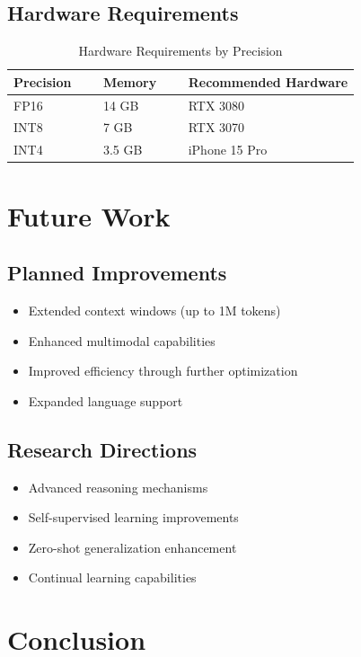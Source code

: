 \documentclass[11pt,a4paper]{article}
\begin{document}
\subsection{Hardware Requirements}
\begin{table}[H]
\centering
\begin{tabular}{lll}
\toprule
\textbf{Precision} \ \ &   \textbf{Memory} \ \ &   \textbf{Recommended Hardware} \\
\midrule
FP16 \ \ &   14 GB \ \ &   RTX 3080 \\
INT8 \ \ &   7 GB \ \ &   RTX 3070 \\
INT4 \ \ &   3.5 GB \ \ &   iPhone 15 Pro \\
\bottomrule
\end{tabular}
\caption{Hardware Requirements by Precision}
\end{table}

\section{Future Work}

\subsection{Planned Improvements}
\begin{itemize}
    \item Extended context windows (up to 1M tokens)
    \item Enhanced multimodal capabilities
    \item Improved efficiency through further optimization
    \item Expanded language support
\end{itemize}

\subsection{Research Directions}
\begin{itemize}
    \item Advanced reasoning mechanisms
    \item Self-supervised learning improvements
    \item Zero-shot generalization enhancement
    \item Continual learning capabilities
\end{itemize}

\section{Conclusion}
\end{document}
